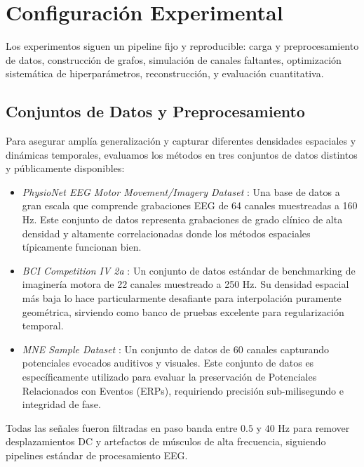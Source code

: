 \section{Configuración Experimental}

Los experimentos siguen un pipeline fijo y reproducible: carga y preprocesamiento de datos, construcción de grafos, simulación de canales faltantes, optimización sistemática de hiperparámetros, reconstrucción, y evaluación cuantitativa.

\subsection{Conjuntos de Datos y Preprocesamiento}
Para asegurar amplía generalización y capturar diferentes densidades espaciales y dinámicas temporales, evaluamos los métodos en tres conjuntos de datos distintos y públicamente disponibles:
\begin{itemize}
\item \emph{PhysioNet EEG Motor Movement/Imagery Dataset} \cite{schalk2004bci2000}: Una base de datos a gran escala que comprende grabaciones EEG de 64 canales muestreadas a 160 Hz. Este conjunto de datos representa grabaciones de grado clínico de alta densidad y altamente correlacionadas donde los métodos espaciales típicamente funcionan bien.
\item \emph{BCI Competition IV 2a} \cite{tangermann2012bci}: Un conjunto de datos estándar de benchmarking de imaginería motora de 22 canales muestreado a 250 Hz. Su densidad espacial más baja lo hace particularmente desafiante para interpolación puramente geométrica, sirviendo como banco de pruebas excelente para regularización temporal.
\item \emph{MNE Sample Dataset} \cite{gramfort2013meg}: Un conjunto de datos de 60 canales capturando potenciales evocados auditivos y visuales. Este conjunto de datos es específicamente utilizado para evaluar la preservación de Potenciales Relacionados con Eventos (ERPs), requiriendo precisión sub-milisegundo e integridad de fase.
\end{itemize}
Todas las señales fueron filtradas en paso banda entre $0.5$ y $40$ Hz para remover desplazamientos DC y artefactos de músculos de alta frecuencia, siguiendo pipelines estándar de procesamiento EEG.

